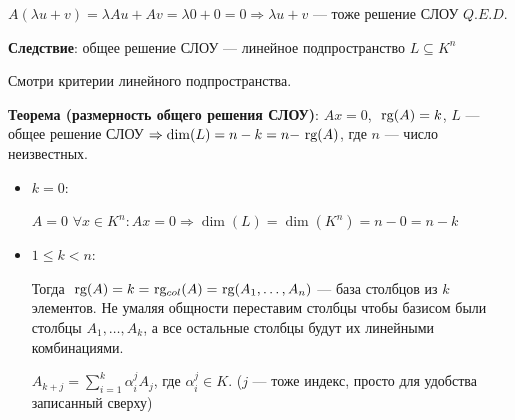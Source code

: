 \(A(\lambda u + v) = \lambda Au + Av = \lambda 0 + 0 = 0 \Rightarrow \lambda u + v\) --- тоже решение СЛОУ \(Q.E.D.\)

\textbf{Следствие}: общее решение СЛОУ --- линейное подпространство \(L \subseteq K^n\)

Смотри критерии линейного подпространства.

\textbf{Теорема (размерность общего  решения СЛОУ)}: \(Ax = 0\), \(\rg(A) = k\), \(L\) --- общее решение СЛОУ \(\Rightarrow \dim(L) = n - k = n - \rg(A)\), где \(n\) --- число неизвестных.

\begin{itemize}
    \item \(k = 0\):

          \(A = 0\) \(\forall x \in K^n: Ax = 0 \Rightarrow \dim(L) = \dim(K^n) = n - 0 = n - k\)

    \item \(1\leq k < n\):

          Тогда \(\rg(A) = k = \rg_{col}(A) = \rg(A_1, \ldots, A_n)\) --- база столбцов из \(k\) элементов. Не умаляя общности переставим столбцы чтобы базисом были столбцы \(A_1,\ldots, A_k\), а все остальные столбцы будут их линейными комбинациями.

          \(A_{k + j} = \sum\limits_{i = 1}^k \alpha_i^j A_j\), где \(\alpha_i^j \in K\). (\(j\) --- тоже индекс, просто для удобства записанный сверху)


\end{itemize}
